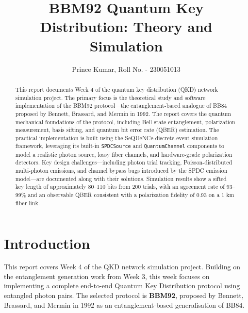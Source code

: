 \documentclass[12pt,oneside,letterpaper,english]{article}
\title{BBM92 Quantum Key Distribution: Theory and Simulation}
\author{Prince Kumar, Roll No. - 230051013}
\begin{document}



\begin{abstract}
    \noindent
    This report documents Week 4 of the quantum key distribution (QKD) network simulation project. The primary focus is the theoretical study and software implementation of the BBM92 protocol---the entanglement-based analogue of BB84 proposed by Bennett, Brassard, and Mermin in 1992. The report covers the quantum mechanical foundations of the protocol, including Bell-state entanglement, polarization measurement, basis sifting, and quantum bit error rate (QBER) estimation. The practical implementation is built using the SeQUeNCe discrete-event simulation framework, leveraging its built-in \texttt{SPDCSource} and \texttt{QuantumChannel} components to model a realistic photon source, lossy fiber channels, and hardware-grade polarization detectors. Key design challenges---including photon trial tracking, Poisson-distributed multi-photon emissions, and channel bypass bugs introduced by the SPDC emission model---are documented along with their solutions. Simulation results show a sifted key length of approximately 80--110 bits from 200 trials, with an agreement rate of 93--99\% and an observable QBER consistent with a polarization fidelity of 0.93 on a 1 km fiber link.
\end{abstract}
\newpage

\renewcommand{\baselinestretch}{1}\normalsize
\tableofcontents
\renewcommand{\baselinestretch}{1}\normalsize
\thispagestyle{fancy}
\newpage

\doublespacing
\thispagestyle{fancy}


\section{Introduction}

This report covers Week 4 of the QKD network simulation project. Building on the entanglement generation work from Week 3, this week focuses on implementing a complete end-to-end Quantum Key Distribution protocol using entangled photon pairs. The selected protocol is \textbf{BBM92}, proposed by Bennett, Brassard, and Mermin in 1992 \cite{BBM92Paper} as an entanglement-based generalisation of BB84.
\end{document}
